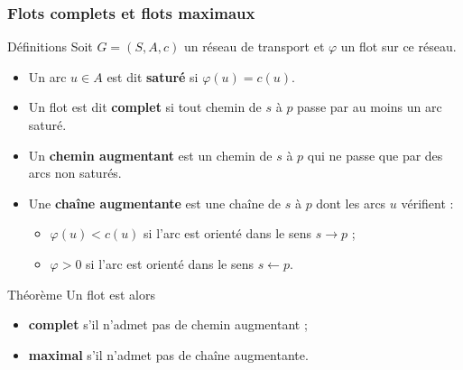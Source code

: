 \documentclass[french,10pt,t,handout]{beamer}
\begin{document}
\begin{frame}%
	\frametitle{Flots complets et flots maximaux}
	
 	\begin{block}{D\'efinitions}
	Soit $G=(S,A,c)$ un r\'eseau de transport et $\varphi$ un flot sur ce r\'eseau.
		\begin{itemize}
		  \item Un arc $u \in A$ est dit \textbf{satur\'e} si $\varphi(u) = c(u)$.
		  \item Un flot est dit \textbf{complet} si tout chemin de $s$ \`a $p$ passe
		  par au moins un arc satur\'e.
		  \item Un \textbf{chemin augmentant} est un chemin de $s$ \`a $p$ qui ne
		  passe que par des arcs non satur\'es.
		  \item Une \textbf{cha\^ine augmentante} est une cha\^ine de $s$ \`a $p$ dont les
		  arcs $u$ v\'erifient :
		  	\begin{itemize}
		  	  \item $\varphi(u) < c(u)$ si l'arc est orient\'e dans le sens $s \to p$ ;
		  	  \item $\varphi > 0$ si l'arc est orient\'e dans le sens $s \gets p$.
		  	\end{itemize}
		\end{itemize}
 	\end{block}
 	
 	\vfill 

	\begin{block}{Th\'eor\`eme}
		Un flot est alors
		\begin{itemize}
		  \item \textbf{complet} s'il n'admet pas de chemin augmentant ;
		  \item \textbf{maximal} s'il n'admet pas de cha\^ine augmentante.
		\end{itemize}
 	\end{block}
\end{frame}
\end{document}
